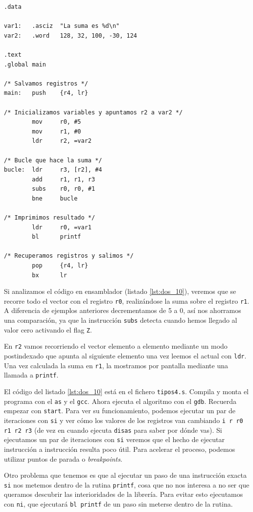 \begin{lstlisting}[caption={Suma de elementos de un vector (tipos4.s)},label={lst:dos_10}]
.data

var1:   .asciz  "La suma es %d\n"
var2:   .word   128, 32, 100, -30, 124

.text
.global main

/* Salvamos registros */
main:   push    {r4, lr}

/* Inicializamos variables y apuntamos r2 a var2 */
        mov     r0, #5
        mov     r1, #0
        ldr     r2, =var2

/* Bucle que hace la suma */
bucle:  ldr     r3, [r2], #4
        add     r1, r1, r3
        subs    r0, r0, #1
        bne     bucle

/* Imprimimos resultado */
        ldr     r0, =var1
        bl      printf

/* Recuperamos registros y salimos */
        pop     {r4, lr}
        bx      lr
\end{lstlisting}

Si analizamos el código en ensamblador (listado \ref{lst:dos_10}), veremos que se
recorre todo el vector con el registro {\tt r0}, realizándose la suma sobre el
registro {\tt r1}. A diferencia de ejemplos anteriores decrementamos de 5 a 0, así
nos ahorramos una comparación, ya que la instrucción {\tt subs} detecta cuando hemos
llegado al valor cero activando el flag {\tt Z}.

En {\tt r2} vamos recorriendo el vector elemento a elemento mediante un modo postindexado
que apunta al siguiente elemento una vez leemos el actual con {\tt ldr}. Una vez calculada
la suma en {\tt r1}, la mostramos por pantalla mediante una llamada a {\tt printf}.

El código del listado \ref{lst:dos_10} está en el fichero {\tt tipos4.s}. Compila y
monta el programa con el {\tt as} y el {\tt gcc}. Ahora ejecuta el algoritmo
con el {\tt gdb}. Recuerda empezar con {\tt start}. Para ver su funcionamiento,
podemos ejecutar un par de iteraciones con {\tt si} y ver cómo los valores de
los registros van cambiando {\tt i r r0 r1 r2 r3} (de vez en cuando ejecuta
{\tt disas} para saber por dónde vas). Si ejecutamos un par de iteraciones con
{\tt si} veremos que el hecho de ejecutar instrucción a instrucción resulta
poco útil. Para acelerar el proceso, podemos utilizar puntos de parada o {\it breakpoints}.

Otro problema que tenemos es que al ejecutar un paso de una instrucción exacta {\tt si}
nos metemos dentro de la rutina {\tt printf}, cosa que no nos interesa a no ser que queramos
descubrir las interioridades de la librería. Para evitar esto ejecutamos con {\tt ni}, que
ejecutará {\tt bl printf} de un paso sin meterse dentro de la rutina.

